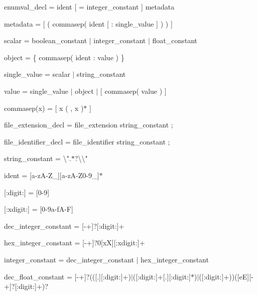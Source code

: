 enumval\+\_\+decl = ident \mbox{[} {\ttfamily =} integer\+\_\+constant \mbox{]} metadata

metadata = \mbox{[} {\ttfamily (} commasep( ident \mbox{[} {\ttfamily \+:} single\+\_\+value \mbox{]} ) {\ttfamily )} \mbox{]}

scalar = boolean\+\_\+constant \texorpdfstring{$\vert$}{|} integer\+\_\+constant \texorpdfstring{$\vert$}{|} float\+\_\+constant

object = {\ttfamily \{} commasep( ident {\ttfamily \+:} value ) {\ttfamily \}}

single\+\_\+value = scalar \texorpdfstring{$\vert$}{|} string\+\_\+constant

value = single\+\_\+value \texorpdfstring{$\vert$}{|} object \texorpdfstring{$\vert$}{|} {\ttfamily \mbox{[}} commasep( value ) {\ttfamily \mbox{]}}

commasep(x) = \mbox{[} x ( {\ttfamily ,} x )\texorpdfstring{$\ast$}{*} \mbox{]}

file\+\_\+extension\+\_\+decl = {\ttfamily file\+\_\+extension} string\+\_\+constant {\ttfamily ;}

file\+\_\+identifier\+\_\+decl = {\ttfamily file\+\_\+identifier} string\+\_\+constant {\ttfamily ;}

string\+\_\+constant = {\ttfamily \textbackslash{}"{}.\texorpdfstring{$\ast$}{*}?\textbackslash{}\textbackslash{}"{}}

ident = {\ttfamily \mbox{[}a-\/z\+A-\/\+Z\+\_\+\mbox{]}\mbox{[}a-\/z\+A-\/\+Z0-\/9\+\_\+\mbox{]}\texorpdfstring{$\ast$}{*}}

{\ttfamily \mbox{[}\+:digit\+:\mbox{]}} = {\ttfamily \mbox{[}0-\/9\mbox{]}}

{\ttfamily \mbox{[}\+:xdigit\+:\mbox{]}} = {\ttfamily \mbox{[}0-\/9a-\/f\+A-\/F\mbox{]}}

dec\+\_\+integer\+\_\+constant = {\ttfamily \mbox{[}-\/+\mbox{]}?\mbox{[}\+:digit\+:\mbox{]}+}

hex\+\_\+integer\+\_\+constant = {\ttfamily \mbox{[}-\/+\mbox{]}?0\mbox{[}xX\mbox{]}\mbox{[}\+:xdigit\+:\mbox{]}+}

integer\+\_\+constant = dec\+\_\+integer\+\_\+constant \texorpdfstring{$\vert$}{|} hex\+\_\+integer\+\_\+constant

dec\+\_\+float\+\_\+constant = {\ttfamily \mbox{[}-\/+\mbox{]}?((\mbox{[}.\mbox{]}\mbox{[}\+:digit\+:\mbox{]}+)\texorpdfstring{$\vert$}{|}(\mbox{[}\+:digit\+:\mbox{]}+\mbox{[}.\mbox{]}\mbox{[}\+:digit\+:\mbox{]}\texorpdfstring{$\ast$}{*})\texorpdfstring{$\vert$}{|}(\mbox{[}\+:digit\+:\mbox{]}+))(\mbox{[}eE\mbox{]}\mbox{[}-\/+\mbox{]}?\mbox{[}\+:digit\+:\mbox{]}+)?}

